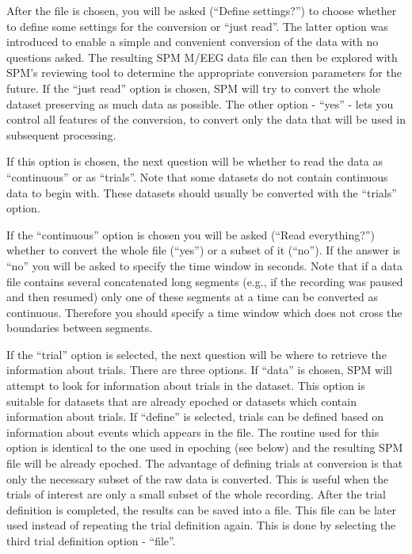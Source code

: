 After the file is chosen, you will be asked (``Define settings?'') to choose whether to define some settings for the conversion or ``just read''. The latter option was introduced to enable a simple and convenient conversion of the data with no questions asked. The resulting SPM M/EEG data file can then be explored with SPM's reviewing tool to determine the appropriate conversion parameters for the future. If the ``just read'' option is chosen, SPM will try to convert the whole dataset preserving as much data as possible. The other option - ``yes'' - lets you control all features of the conversion, to convert only the data that will be used in subsequent processing.

If this option is chosen, the next question will be whether to read the data as ``continuous'' or as ``trials''. Note that some datasets do not contain continuous data to begin with. These datasets should usually be converted with the ``trials'' option.

If the ``continuous'' option is chosen you will be asked (``Read everything?'') whether to convert the whole file (``yes'') or a subset of it (``no''). If the answer is ``no'' you will be asked to specify the time window in seconds. Note that if a data file contains several concatenated long segments (e.g., if the recording was paused and then resumed) only one of these segments at a time can be converted as continuous. Therefore you should specify a time window which does not cross the boundaries between segments.

If the ``trial'' option is selected, the next question will be where to retrieve the information about trials. There are three options. If ``data'' is chosen, SPM will attempt to look for information about trials in the dataset. This option is suitable for datasets that are already epoched or datasets which contain information about trials. If ``define'' is selected, trials can be defined based on information about events which appears in the file. The routine used for this option is identical to the one used in epoching (see below) and the resulting SPM file will be already epoched. The advantage of defining trials at conversion is that only the necessary subset of the raw data is converted. This is useful when the trials of interest are only a small subset of the whole recording. After the trial definition is completed, the results can be saved into a file. This file can be later used instead of repeating the trial definition again. This is done by selecting the third trial definition option - ``file''.

